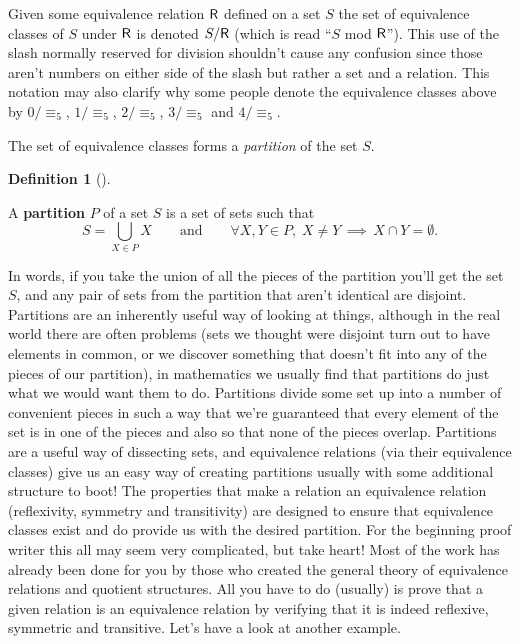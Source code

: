 \documentclass[10pt,]{book}
\newcommand{\terminology}[1]{\textbf{#1}}
\theoremstyle{plain}
\theoremstyle{definition}
\newtheorem{definition}[theorem]{Definition}
\theoremstyle{definition}
\numberwithin{equation}{section}
\newcommand{\relR}{\mbox{\textsf R}}
\begin{document}
    Given some equivalence relation \(\relR\) defined on a set \(S\) the set of equivalence classes
    of \(S\) under \(\relR\) is denoted \(S/\relR\) (which is read ``\(S\) mod \(\relR\)''). This use of the
    slash \textemdash{} normally reserved for division \textemdash{} shouldn't cause any confusion since those aren't
    numbers on either side of the slash but rather a set and a relation. This
    notation may also clarify why some people denote the equivalence classes above
    by \(0/\equiv_5\), \(1/\equiv_5\), \(2/\equiv_5\), \(3/\equiv_5\) and \(4/\equiv_5\).
\par

    The set of equivalence
    classes forms a  \emph{partition} of the set \(S\).
\begin{definition}[{}]\label{definition-10}

        A \terminology{partition} \(P\) of a set \(S\) is a set of sets such that
        \begin{equation*}
          S = \bigcup_{X \in P} X \qquad \mbox{and}  \qquad 
          \forall X, Y \in P, \; X \neq Y \, \implies \, X \cap Y = \emptyset.
        \end{equation*}
\end{definition}
\par

    In words, if you take the union of all the pieces of the partition you'll get the
    set \(S\), and any pair of sets from the partition that aren't identical are disjoint.
    Partitions are an inherently useful way of looking at things, although in the real world
    there are often problems (sets we thought were disjoint turn out to have elements in common,
    or we discover something that doesn't fit into any of the pieces of our partition), in
    mathematics we usually find that partitions do just what we would want them to do.
    Partitions divide some set up into a number of convenient pieces in such a way that we're
    guaranteed that every element of the set is in one of the pieces and also so that none of
    the pieces overlap. Partitions are a useful way of dissecting sets, and equivalence relations
    (via their equivalence classes) give us an easy way of creating partitions \textemdash{} usually with some additional structure to boot! The
    properties that make a relation an equivalence relation (reflexivity, symmetry and
    transitivity) are designed to ensure that equivalence classes exist and do provide us
    with the desired partition. For the beginning proof writer this all may seem very complicated,
    but take heart! Most of the work has already been done for you by those who created
    the general theory of equivalence relations and quotient structures. All you have
    to do (usually) is prove that a given relation is an equivalence relation by verifying
    that it is indeed reflexive, symmetric and transitive. Let's have a look at another
    example.
\par
\end{document}
